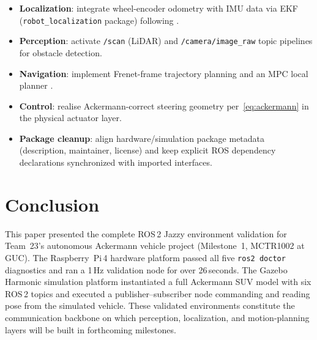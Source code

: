\documentclass[conference]{IEEEtran}
\begin{document}
\begin{itemize}
  \item \textbf{Localization}: integrate wheel-encoder odometry with IMU data
        via EKF (\texttt{robot\_localization} package) following
        \cite{Promkaew2024,Georgiev2025}.
  \item \textbf{Perception}: activate \texttt{/scan} (LiDAR) and
        \texttt{/camera/image\_raw} topic pipelines for obstacle detection.
  \item \textbf{Navigation}: implement Frenet-frame trajectory planning
        \cite{Wang2020} and an MPC local planner \cite{Li2022}.
  \item \textbf{Control}: realise Ackermann-correct steering geometry
        per~\eqref{eq:ackermann} in the physical actuator layer.
    \item \textbf{Package cleanup}: align hardware/simulation package metadata
      (description, maintainer, license) and keep explicit ROS dependency
      declarations synchronized with imported interfaces.
\end{itemize}

\section{Conclusion}
\label{sec:conclusion}

This paper presented the complete ROS\,2 Jazzy environment validation for
Team~23's autonomous Ackermann vehicle project (Milestone~1, MCTR1002 at GUC).
The Raspberry~Pi\,4 hardware platform passed all five \texttt{ros2 doctor}
diagnostics and ran a 1\,Hz validation node for over 26\,seconds. The Gazebo
Harmonic simulation platform instantiated a full Ackermann SUV model with six
ROS\,2 topics and executed a publisher--subscriber node commanding and reading
pose from the simulated vehicle. These validated environments constitute the
communication backbone on which perception, localization, and motion-planning
layers will be built in forthcoming milestones.



\end{document}
